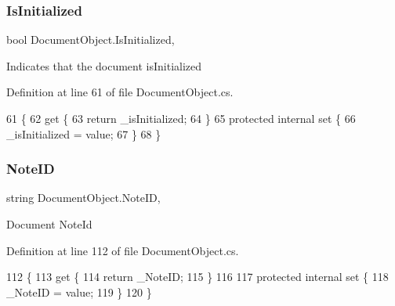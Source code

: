 \subsubsection{\texorpdfstring{Is\+Initialized}{IsInitialized}}
{\footnotesize\ttfamily bool Document\+Object.\+Is\+Initialized\hspace{0.3cm}{\ttfamily [get]}, {\ttfamily [set]}}



Indicates that the document is\+Initialized 



Definition at line 61 of file Document\+Object.\+cs.


\begin{DoxyCode}
61                               \{
62         \textcolor{keyword}{get} \{
63             \textcolor{keywordflow}{return} \_isInitialized;
64         \}
65         \textcolor{keyword}{protected} \textcolor{keyword}{internal} \textcolor{keyword}{set} \{
66             \_isInitialized = value;
67         \}
68     \}
\end{DoxyCode}
\mbox{\label{class_document_object_ac447461e3dc7f8258695f902ef0758a7}} 
\subsubsection{\texorpdfstring{Note\+ID}{NoteID}}
{\footnotesize\ttfamily string Document\+Object.\+Note\+ID\hspace{0.3cm}{\ttfamily [get]}, {\ttfamily [set]}}



Document Note\+Id 



Definition at line 112 of file Document\+Object.\+cs.


\begin{DoxyCode}
112                          \{
113         \textcolor{keyword}{get} \{
114             \textcolor{keywordflow}{return} \_NoteID;
115         \}
116 
117         \textcolor{keyword}{protected} \textcolor{keyword}{internal} \textcolor{keyword}{set} \{
118             \_NoteID = value;
119         \}
120     \}
\end{DoxyCode}
\mbox{\label{class_document_object_abdc1a6dfc1bb2261b523cf94468448b9}} 
